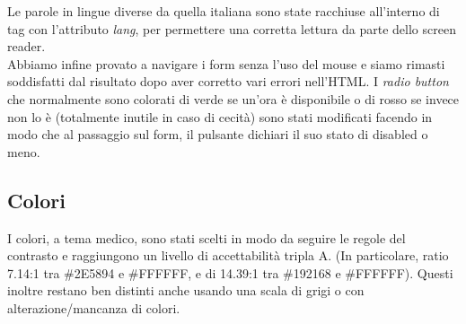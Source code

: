 Le parole in lingue diverse da quella italiana sono state racchiuse all'interno di tag con l'attributo \textit{lang}, per permettere una corretta lettura da parte dello screen reader.\\


Abbiamo infine provato a navigare i form senza l’uso del mouse e siamo rimasti soddisfatti dal risultato dopo aver corretto vari errori nell’HTML.
I \textit{radio button} che normalmente sono colorati di verde se un’ora è disponibile o di rosso se invece non lo è (totalmente inutile in caso di cecità) sono stati modificati facendo in modo che al passaggio sul form, il pulsante dichiari il suo stato di disabled o meno.

\pagebreak

\subsection{Colori}

I colori, a tema medico, sono stati scelti in modo da seguire le regole del contrasto e raggiungono un livello di accettabilità tripla A. (In particolare, ratio 7.14:1 tra \#2E5894 e \#FFFFFF, e di 14.39:1 tra \#192168 e \#FFFFFF).
Questi inoltre restano ben distinti anche usando una scala di grigi o con alterazione/mancanza di colori.\\

\begin{center}
\end{center}

\bigskip

